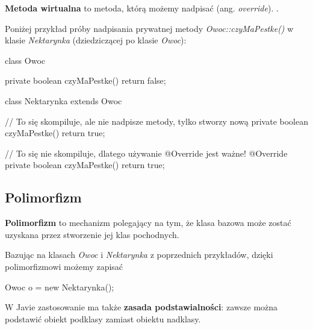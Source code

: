 \textbf{Metoda wirtualna} to metoda, którą możemy nadpisać (ang. \textit{override}). .

\begin{example}
    Poniżej przykład próby nadpisania prywatnej metody \textit{Owoc::czyMaPestke()} w klasie \textit{Nektarynka} (dziedziczącej po klasie \textit{Owoc}):
    \begin{java}
        class Owoc {

            private boolean czyMaPestke() {
                return false;
            }
        }

        class Nektarynka extends Owoc {

            // To się skompiluje, ale nie nadpisze metody, tylko stworzy nową
            private boolean czyMaPestke() {
                return true;
            }

            // To się nie skompiluje, dlatego używanie @Override jest ważne!
            @Override
            private boolean czyMaPestke() {
                return true;
            }
        }
    \end{java}
\end{example}

\subsection{Polimorfizm}
\textbf{Polimorfizm} to mechanizm polegający na tym, że klasa bazowa może zostać uzyskana przez stworzenie jej klas pochodnych.

\begin{example}
    Bazując na klasach \textit{Owoc} i \textit{Nektarynka} z poprzednich przykładów, dzięki polimorfizmowi możemy zapisać
    \begin{java}
        Owoc o = new Nektarynka();
    \end{java}
\end{example}

W Javie zastosowanie ma także \textbf{zasada podstawialności}: zawsze można podstawić obiekt podklasy zamiast obiektu nadklasy.

